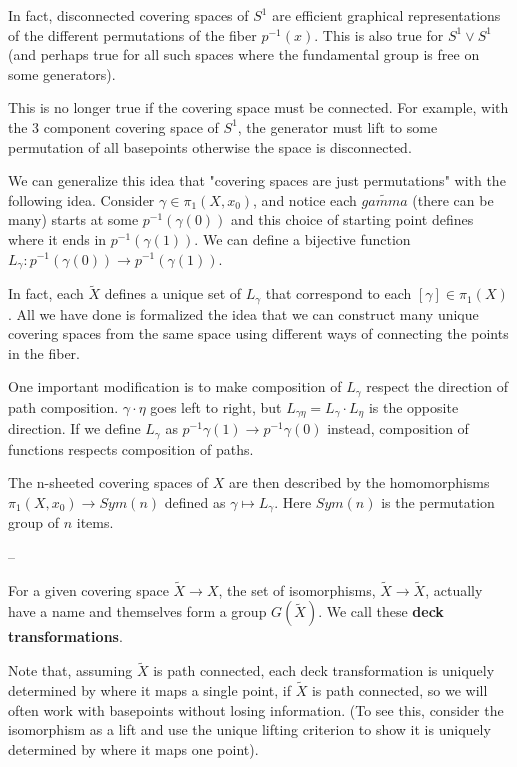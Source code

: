 \documentclass[10pt]{article}
\begin{document}
In fact, disconnected covering spaces of $S^1$ are efficient graphical
representations of the different permutations of the fiber $p^{-1}(x)$.
This is also true for $S^1 \vee S^1$ (and perhaps true for all such spaces
where the fundamental group is free on some generators). 

This is no longer true if the covering space must be connected. For example,
with the 3 component covering space of $S^1$, the generator must lift to some
permutation of all basepoints otherwise the space is disconnected.

We can generalize this idea that "covering spaces are just permutations" with
the following idea. Consider $\gamma \in \pi_1(X, x_0)$, and notice each
$\tilde{gamma}$ (there can be many) starts at some $p^{-1}(\gamma(0))$ and this
choice of starting point defines where it ends in $p^{-1}(\gamma(1))$. We can
define a bijective function $L_{\gamma}: p^{-1}(\gamma(0)) \to p^{-1}(\gamma(1))$.

In fact, each $\tilde{X}$ defines a unique set of $L_{\gamma}$ that correspond
to each $[\gamma] \in \pi_1(X)$. All we have done is formalized the idea that
we can construct many unique covering spaces from the same space using
different ways of connecting the points in the fiber.

One important modification is to make composition of $L_{\gamma}$ respect the
direction of path composition. $\gamma \cdot \eta$ goes left to right, but
$L_{\gamma \eta} = L_{\gamma}\cdot L_{\eta}$ is the opposite direction. If we
define $L_{\gamma}$ as $p^{-1}{\gamma(1)} \to p^{-1}{\gamma(0)}$ instead,
composition of functions respects composition of paths.

The n-sheeted covering spaces of $X$ are then described by the homomorphisms
$\pi_1(X, x_0) \to Sym(n)$ defined as $\gamma \mapsto L_{\gamma}$. Here
$Sym(n)$ is the permutation group of $n$ items.

--

For a given covering space $\tilde{X} \to X$, the set of isomorphisms,
$\tilde{X} \to \tilde{X}$, actually have a name and themselves form a group
$G(\tilde{X})$. We call these \textbf{deck transformations}.

Note that, assuming $\tilde{X}$ is path connected, each deck transformation is
uniquely determined by where it maps a single point, if $\tilde{X}$ is path
connected, so we will often work with basepoints without losing information.
(To see this, consider the isomorphism as a lift and use the unique lifting
criterion to show it is uniquely determined by where it maps one point).
\end{document}
